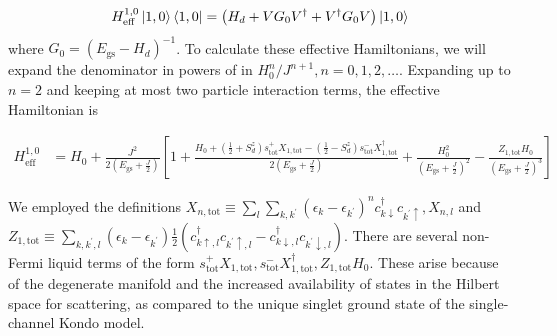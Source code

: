 \documentclass[reprint,prb,superscriptaddress]{revtex4-2}
\begin{document}
\begin{align}
	\label{eff_ham_10}
	H^{1,0}_\text{eff}\ket{1, 0}\bra{1, 0} = \left(H_d + V G_0 V^\dagger + V^\dagger G_0  V\right) \ket{1, 0}
\end{align}
where \(G_0 = \left(E_\text{gs} - H_d\right)^{-1}\). To calculate these effective Hamiltonians, we will expand the denominator in powers of in \(H_0^n/J^{n+1}, n=0,1,2,\ldots\). Expanding up to \(n=2\) and keeping at most two particle interaction terms, 
the effective Hamiltonian is
\begin{widetext}
\begin{align}
	H_\text{eff}^{1, 0} &= H_0 + \frac{J^2}{2\left(E_\text{gs} + \frac{J}{2}\right)}\left[1 + \frac{ H_0 + \left(\frac{1}{2} + S_d^z\right) s^+_\text{tot}X_{1,\text{tot}} - \left(\frac{1}{2} - S_d^z\right) s^-_\text{tot}X^\dagger_{1,\text{tot}}}{2 \left(E_\text{gs} + \frac{J}{2}\right)} + \frac{H_0^2}{\left(E_\text{gs} + \frac{J}{2}\right)^2} - \frac{Z_{1,\text{tot}} H_0}{\left(E_\text{gs} + \frac{J}{2}\right)^3} \right]
\end{align}
\end{widetext}
We employed the definitions \(X_{n,\text{tot}} \equiv  \sum_l \sum_{k,k^\prime}\left(\epsilon_k - \epsilon_{k^\prime}\right)^n c^\dagger_{k \downarrow}c_{k^\prime \uparrow},  X_{n,l}\) and \( Z_{1,\text{tot}} \equiv \sum_{k,k^\prime,l}\left( \epsilon_k - \epsilon_{k^\prime} \right) \frac{1}{2}\left(c^\dagger_{k \uparrow,l}c_{k^\prime \uparrow,l} - c^\dagger_{k \downarrow,l}c_{k^\prime \downarrow,l}\right)\). There are several non-Fermi liquid terms of the form \(s^+_\text{tot}X_{1,\text{tot}}, s^-_\text{tot}X^\dagger_{1,\text{tot}},Z_{1,\text{tot}} H_0\). These arise because of the degenerate manifold and the increased availability of states in the Hilbert space for scattering, as compared to the unique singlet ground state of the single-channel Kondo model.
\end{document}
